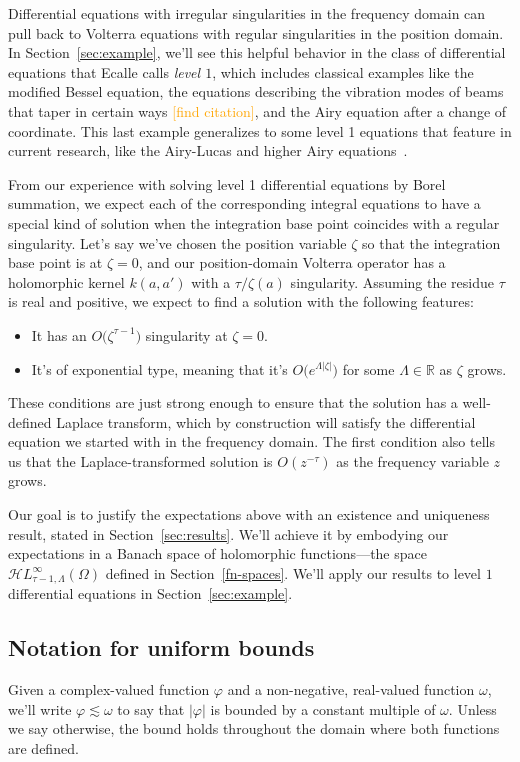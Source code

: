 \documentclass{article}
\theoremstyle{plain}
\newcommand{\R}{\mathbb{R}}
\newcommand{\singexp}[2]{\mathcal{H}L^\infty_{#1, #2}}
\newcommand{\domain}{\Omega}
\begin{document}
Differential equations with irregular singularities in the frequency domain can pull back to Volterra equations with regular singularities in the position domain. In Section~\ref{sec:example}, we'll see this helpful behavior in the class of differential equations that Ecalle calls {\em level $1$}, which includes classical examples like the modified Bessel equation, the equations describing the vibration modes of beams that taper in certain ways \textcolor{orange}{[find citation]}, and the Airy equation after a change of coordinate. This last example generalizes to some level 1 equations that feature in current research, like the Airy-Lucas and higher Airy equations~\cite[Equations 3.2 and 3.8]{charbonnier22}\cite{durugo_higher}.

From our experience with solving level 1 differential equations by Borel summation, we expect each of the corresponding integral equations to have a special kind of solution when the integration base point coincides with a regular singularity. Let's say we've chosen the position variable $\zeta$ so that the integration base point is at $\zeta = 0$, and our position-domain Volterra operator has a holomorphic kernel $k(a, a')$ with a $\tau/\zeta(a)$ singularity. Assuming the residue $\tau$ is real and positive, we expect to find a solution with the following features:
\begin{itemize}
\item It has an $O\big(\zeta^{\tau-1}\big)$ singularity at $\zeta = 0$.
\item It's of exponential type, meaning that it's $O\big(e^{\Lambda|\zeta|}\big)$ for some $\Lambda \in \R$ as $\zeta$ grows.
\end{itemize}
These conditions are just strong enough to ensure that the solution has a well-defined Laplace transform, which by construction will satisfy the differential equation we started with in the frequency domain. The first condition also tells us that the Laplace-transformed solution is $O(z^{-\tau})$ as the frequency variable $z$ grows.

Our goal is to justify the expectations above with an existence and uniqueness result, stated in Section~\ref{sec:results}. We'll achieve it by embodying our expectations in a Banach space of holomorphic functions---the space $\singexp{\tau-1}{\Lambda}(\domain)$ defined in Section~\ref{fn-spaces}. We'll apply our results to level $1$ differential equations in Section~\ref{sec:example}.
\subsection{Notation for uniform bounds}
Given a complex-valued function $\varphi$ and a non-negative, real-valued function $\omega$, we'll write $\varphi \lesssim \omega$ to say that $|\varphi|$ is bounded by a constant multiple of $\omega$. Unless we say otherwise, the bound holds throughout the domain where both functions are defined.
\end{document}
